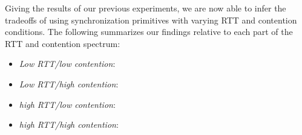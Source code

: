 Giving the results of our previous experiments, we are now able to infer the tradeoffs of using synchronization primitives with varying RTT and contention conditions. The following summarizes our findings relative to each part of the RTT and contention spectrum:
\begin{itemize}
\item{\emph{Low RTT/low contention}: }
\item{\emph{Low RTT/high contention}: }
\item{\emph{high RTT/low contention}: }
\item{\emph{high RTT/high contention}: }
\end{itemize}
















